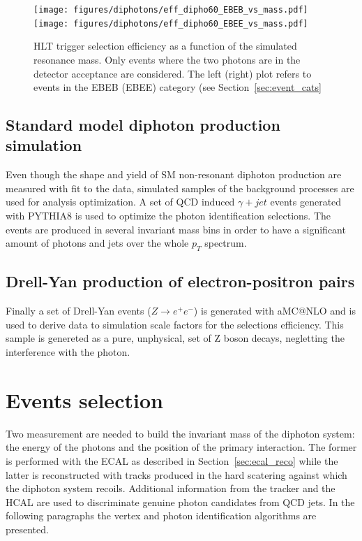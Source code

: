 \begin{figure}[h!]
  \centering
  \texttt{[image: figures/diphotons/eff\_dipho60\_EBEB\_vs\_mass.pdf]}
  \texttt{[image: figures/diphotons/eff\_dipho60\_EBEE\_vs\_mass.pdf]}
  \caption{HLT trigger selection efficiency as a function of the simulated resonance mass. Only events where the two photons are
    in the detector acceptance are considered. The left (right) plot refers to events in the EBEB (EBEE)
    category (see Section~\ref{sec:event_cats}}
  \label{fig:trig_eff_sig}
\end{figure}

\subsection{Standard model diphoton production simulation}
Even though the shape and yield of SM non-resonant diphoton production are measured with fit to the data,
simulated samples of the background processes are used for analysis optimization. A set of QCD induced
$\gamma+jet$ events generated with PYTHIA8 is used to optimize the photon identification selections.
The events are produced in several invariant mass bins in order to have a significant amount of photons and
jets over the whole $p_T$ spectrum.

\subsection{Drell-Yan production of electron-positron pairs}
Finally a set of Drell-Yan events ($Z \to e^{+}e^{-}$) is generated with aMC@NLO and is
used to derive data to simulation scale factors for the selections efficiency. This sample is genereted
as a pure, unphysical, set of Z boson decays, negletting the interference with the photon.

\clearpage
\section{Events selection}
\label{sec:dipho_selection}
Two measurement are needed to build the invariant mass of the diphoton system: the energy of the
photons and the position of the primary interaction. The former is performed with the ECAL as described in
Section~\ref{sec:ecal_reco} while the latter is reconstructed with tracks produced in the hard scatering against which
the diphoton system recoils. Additional information from the tracker and the HCAL are used to discriminate
genuine photon candidates from QCD jets.
In the following paragraphs the vertex and photon identification algorithms are presented.

